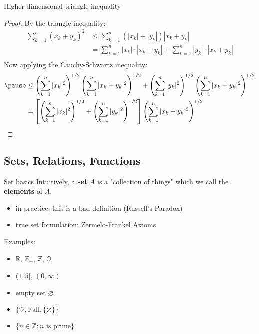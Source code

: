 \documentclass{beamer}
\begin{document}
\begin{frame}{Higher-dimensional triangle inequality}
\begin{proof}
By the triangle inequality:
\pause
{\tiny
\begin{align*}
\sum_{k=1}^n (x_k+y_k)^2
  & \leq \sum_{k=1}^n (|x_k|+|y_k|)|x_k+y_k|\\
  & =    \sum_{k=1}^n |x_k|\cdot|x_k+y_k| + \sum_{k=1}^n |y_k|\cdot|x_k+y_k|\\
\end{align*}
}
\pause
Now applying the Cauchy-Schwartz inequality: 
\pause
{\tiny
\begin{align*}
\pause
  & \leq \left(\sum_{k=1}^n |x_k|^2\right)^{1/2}\left(\sum_{k=1}^n |x_k+y_k|^2\right)^{1/2}  +  \left(\sum_{k=1}^n |y_k|^2\right)^{1/2}\left(\sum_{k=1}^n |x_k+y_k|^2\right)^{1/2}\\
  & = \left[\left(\sum_{k=1}^n |x_k|^2\right)^{1/2}  +  \left(\sum_{k=1}^n |y_k|^2\right)^{1/2}\right] \left(\sum_{k=1}^n |x_k+y_k|^2\right)^{1/2}
\end{align*}
}
\end{proof}
\end{frame}

\subsection{Sets, Relations, Functions}

\begin{frame}{Set basics}
Intuitively, a \textbf{set} $A$ is a "collection of things" which we call the \textbf{elements} of $A$.
\begin{itemize}
\pause
\item in practice, this is a bad definition (Russell's Paradox)
\pause
\item true set formulation: Zermelo-Frankel Axioms
\end{itemize}
\pause
Examples:
\begin{itemize}
\pause
\item $\mathbb R$, $\mathbb{Z}_+$, $\mathbb{Z}$, $\mathbb{Q}$
\pause
\item $(1,5]$, $(0,\infty)$
\pause
\item empty set $\varnothing$
\pause
\item $\{\heartsuit,\text{Fall}, \{\varnothing\}\}$
\pause
\item $\{n\in \mathbb{Z}: \text{$n$ is prime}\}$
\end{itemize}
\end{frame}
\end{document}
